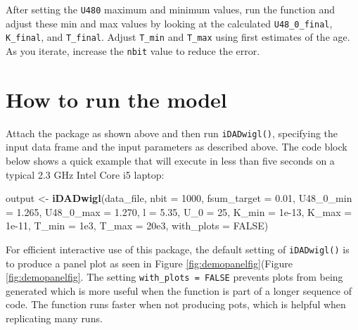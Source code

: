 \documentclass[]{elsarticle} %
\newenvironment{Shaded}{\begin{snugshade}}{\end{snugshade}}
\newcommand{\DataTypeTok}[1]{\textcolor[rgb]{0.13,0.29,0.53}{#1}}
\newcommand{\DecValTok}[1]{\textcolor[rgb]{0.00,0.00,0.81}{#1}}
\newcommand{\FloatTok}[1]{\textcolor[rgb]{0.00,0.00,0.81}{#1}}
\newcommand{\KeywordTok}[1]{\textcolor[rgb]{0.13,0.29,0.53}{\textbf{#1}}}
\newcommand{\NormalTok}[1]{#1}
\newcommand{\OtherTok}[1]{\textcolor[rgb]{0.56,0.35,0.01}{#1}}
\newcommand{\StringTok}[1]{\textcolor[rgb]{0.31,0.60,0.02}{#1}}
\begin{document}
After setting the \texttt{U480} maximum and minimum values, run the function and adjust these min and max values by looking at the calculated \texttt{U48\_0\_final}, \texttt{K\_final}, and \texttt{T\_final}. Adjust \texttt{T\_min} and \texttt{T\_max} using first estimates of the age. As you iterate, increase the \texttt{nbit} value to reduce the error.

\newpage

\hypertarget{how-to-run-the-model}{%
\section{How to run the model}\label{how-to-run-the-model}}

Attach the package as shown above and then run \texttt{iDADwigl()}, specifying the input data frame and the input parameters as described above. The code block below shows a quick example that will execute in less than five seconds on a typical 2.3 GHz Intel Core i5 laptop:

\begin{Shaded}
\begin{Highlighting}[]
\NormalTok{output <-}\StringTok{ }\KeywordTok{iDADwigl}\NormalTok{(data_file,}
                   \DataTypeTok{nbit =} \DecValTok{1000}\NormalTok{,}
                   \DataTypeTok{fsum_target =} \FloatTok{0.01}\NormalTok{,}
                   \DataTypeTok{U48_0_min =} \FloatTok{1.265}\NormalTok{,}
                   \DataTypeTok{U48_0_max =} \FloatTok{1.270}\NormalTok{,}
                   \DataTypeTok{l =} \FloatTok{5.35}\NormalTok{,}
                   \DataTypeTok{U_0 =} \DecValTok{25}\NormalTok{,}
                   \DataTypeTok{K_min =} \FloatTok{1e-13}\NormalTok{,}
                   \DataTypeTok{K_max =} \FloatTok{1e-11}\NormalTok{,}
                   \DataTypeTok{T_min =} \FloatTok{1e3}\NormalTok{,}
                   \DataTypeTok{T_max =} \FloatTok{20e3}\NormalTok{,}
                   \DataTypeTok{with_plots =} \OtherTok{FALSE}\NormalTok{)}
\end{Highlighting}
\end{Shaded}

For efficient interactive use of this package, the default setting of \texttt{iDADwigl()} is to produce a panel plot as seen in Figure \ref{fig:demopanelfig}(Figure \ref{fig:demopanelfig}. The setting \texttt{with\_plots\ =\ FALSE} prevents plots from being generated which is more useful when the function is part of a longer sequence of code. The function runs faster when not producing pots, which is helpful when replicating many runs.
\end{document}
